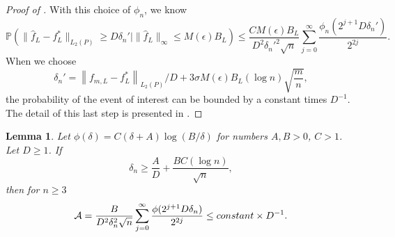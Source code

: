 \documentclass[12pt]{article}
\newtheorem{lemma}[theorem]{Lemma}
\begin{document}
\begin{appendices}
\begin{proof}[Proof of ]
With this choice of $\phi_n$, we know
\begin{equation*}
\mathbb{P}\left(\|\widehat{f}_L-f_L^*\|_{L_2(P)} \geq D \delta_n' \mid\|\widehat{f}_L\|_{\infty} \leq M(\epsilon) B_L\right) \leq 
\frac{C M(\epsilon)B_L}{D^2 \delta_n'^2 \sqrt{n}} \sum_{j=0}^{\infty} \frac{\phi_n\left(2^{j+1} D \delta_n'\right)}{2^{2 j}}.
\end{equation*}
When we choose
\begin{equation*}
    \delta_n' = 
\left\|f_{m, L}-f_L^*\right\|_{L_2(P)}/D + 3\sigma M(\epsilon)B_L  (\log n)\sqrt{\frac{m}{n}},
\end{equation*}
the probability of the event of interest can be bounded by a constant times $D^{-1}$. The detail of this last step is presented in .
\end{proof}

\begin{lemma}\label{lemma: tail probability}
Let $\phi(\delta) = C(\delta + A)\log(B/\delta)$ for numbers $A, B> 0$, $C >1$. Let $D \geq 1$. If 
\[
\delta_n \geq \frac{A}{D} + \frac{BC (\log n)}{\sqrt{n}},
\]
then for $n\geq 3$
\[
\mathcal{A} = \frac{B}{D^2 \delta_n^2 \sqrt{n}} \sum_{j=0}^{\infty} \frac{\phi(2^{j+1} D \delta_n)}{2^{2j}} \leq {\rm constant }\times D^{-1}.
\]
\end{lemma}


\end{appendices}
\end{document}
